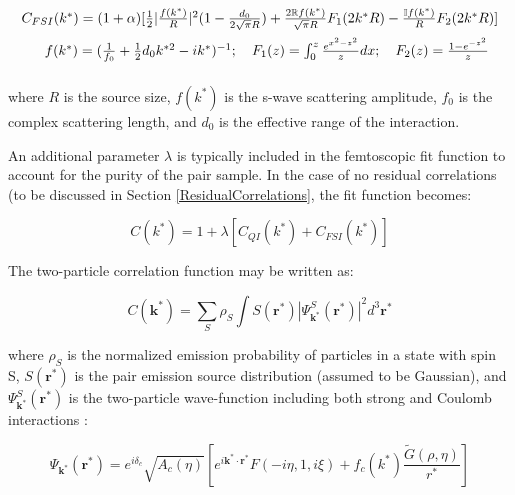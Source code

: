 \documentclass[ALICE,manyauthors]{cernphprep}
\begin{document}
\begin{equation}
\begin{array}{l}
\vspace{2mm}  %
  C_{FSI}(k^{*}) = (1+\alpha)[\frac{1}{2}|\frac{f(k^{*})}{R}|^2(1-\frac{d_{0}}{2\sqrt{\pi}R})+\frac{2\mathbb{R}f(k^{*})}{\sqrt{\pi}R}F_{1}(2k^{*}R)-\frac{\mathbb{I}f(k^{*})}{R}F_{2}(2k^{*}R)] \\
\vspace{2mm}  %
  ~~~~~f(k^{*}) = (\frac{1}{f_{0}}+\frac{1}{2}d_{0}k^{*2}-ik^{*})^{-1};~~~
  F_{1}(z) = \int_{0}^{z} \frac{e^{x^{2}-z^{2}}}{z}dx;~~~
  F_{2}(z) = \frac{1-e^{-z^{2}}}{z}
\end{array}  
\label{eqn:CFSI}
\end{equation}

where $R$ is the source size, $f(k^{*})$ is the s-wave scattering amplitude, $f_{0}$ is the complex scattering length, and $d_{0}$ is the effective range of the interaction.

An additional parameter $\lambda$ is typically included in the femtoscopic fit function to account for the purity of the pair sample.  In the case of no residual correlations (to be discussed in Section \ref{ResidualCorrelations}, the fit function becomes:

\begin{equation}
 C(k^{*}) = 1 + \lambda[C_{QI}(k^{*}) + C_{FSI}(k^{*})]
\label{eqn:LednickyEqnwLambda}
\end{equation}




The two-particle correlation function may be written as:

\begin{equation}
 C(\mathbf{k^{*}}) = \sum\limits_{S}\rho_{S}\int S(\mathbf{r^{*}})|\Psi^{S}_{\mathbf{k^{*}}}(\mathbf{r^{*}})|^{2}d^{3}\mathbf{r^{*}}
\label{eqn:GenCfEqn}
\end{equation}

where $\rho_{S}$ is the normalized emission probability of particles in a state with spin S, $S(\mathbf{r}^{*})$ is the pair emission source distribution (assumed to be Gaussian), and $\Psi^{S}_{\mathbf{k}^{*}}(\mathbf{r}^{*})$ is the two-particle wave-function including both strong and Coulomb interactions \cite{Lednicky:2005tb}:

\begin{equation}
 \Psi_{\mathbf{k^{*}}}(\mathbf{r^{*}}) = e^{i\delta_{c}}\sqrt{A_{c}(\eta)}[e^{i\mathbf{k^{*}} \cdot \mathbf{r^{*}}}F(-i\eta,1,i\xi) + f_{c}(k^{*})\frac{\tilde{G}(\rho,\eta)}{r^{*}}]
\label{eqn:CoulombWaveFcn}
\end{equation}
\end{document}
